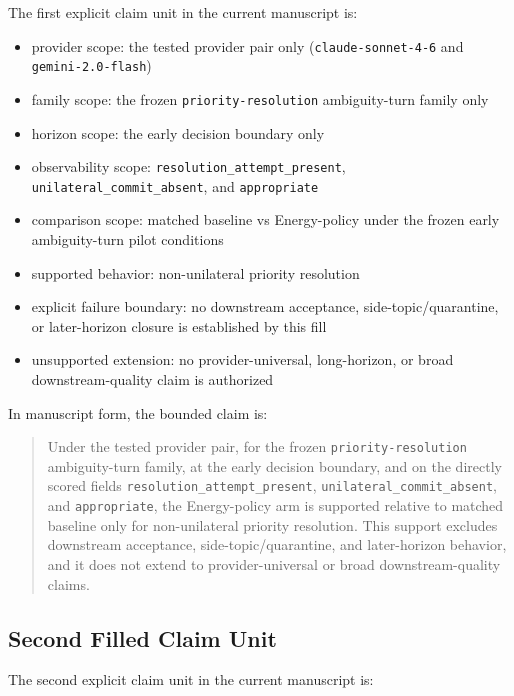 \documentclass[11pt]{article}
\begin{document}
The first explicit claim unit in the current manuscript is:

\begin{itemize}
\item provider scope:
  the tested provider pair only (\texttt{claude-sonnet-4-6} and
  \texttt{gemini-2.0-flash})
\item family scope:
  the frozen \texttt{priority-resolution} ambiguity-turn family only
\item horizon scope:
  the early decision boundary only
\item observability scope:
  \texttt{resolution\_attempt\_present},
  \texttt{unilateral\_commit\_absent}, and \texttt{appropriate}
\item comparison scope:
  matched baseline vs Energy-policy under the frozen early
  ambiguity-turn pilot conditions
\item supported behavior:
  non-unilateral priority resolution
\item explicit failure boundary:
  no downstream acceptance, side-topic/quarantine, or later-horizon closure is
  established by this fill
\item unsupported extension:
  no provider-universal, long-horizon, or broad downstream-quality claim is
  authorized
\end{itemize}

In manuscript form, the bounded claim is:

\begin{quote}
Under the tested provider pair, for the frozen \texttt{priority-resolution}
ambiguity-turn family, at the early decision boundary, and on the directly scored
fields \texttt{resolution\_attempt\_present},
\texttt{unilateral\_commit\_absent}, and \texttt{appropriate}, the Energy-policy
arm is supported relative to matched baseline only for non-unilateral priority
resolution. This support excludes downstream acceptance, side-topic/quarantine,
and later-horizon behavior, and it does not extend to provider-universal or broad
downstream-quality claims.
\end{quote}

\subsection{Second Filled Claim Unit}

The second explicit claim unit in the current manuscript is:
\end{document}
